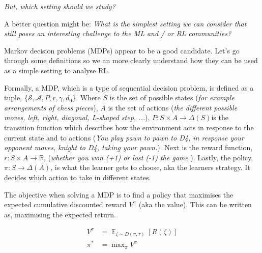 \begin{displayquote}
  \textit{But, which setting should we study?}
\end{displayquote}

\begin{displayquote}
  A better question might be: \textit{What is the simplest setting we can
  consider that still poses an interesting challenge to the ML and / or RL communities?}\footnotemark[26]
\end{displayquote}


Markov decision problems (MDPs) appear to be a good candidate. Let's go through some definitions so we an more clearly understand how they can be used as a
simple setting to analyse RL.

Formally, a MDP, which is a type of sequential decision problem, is defined
as a tuple, $\{\mathcal S, \mathcal A, P,r, \gamma, d_0\}$.
Where $S$ is the set of possible states (\textit{for example arrangements of chess pieces}),
$A$ is the set of actions (\textit{the different possible moves, left,
right, diagonal, L-shaped step, ...}),  $P: S \times A \to \Delta(S)$\footnotemark[16]
is the transition function which describes how the environment acts in response
to the current state and to actions (\textit{You play pawn to pawn to D4, in response your
opponent moves, knight to D4, taking your pawn.}). Next is the reward function, $r: S\times A \to \mathbb R$,
(\textit{whether you won (+1) or lost (-1) the game }).
Lastly, the policy, $\pi: S \to \Delta(A)$, is what the learner gets to choose, aka the learners strategy.
It decides which action to take in different states.


\vspace{5mm}

The objective when solving a MDP is to find a policy
that maximises the expected cumulative discounted reward $V^{\pi}$ (aka the value). This
can be written as, maximising the expected return.

\begin{align*}
V^{\pi} &= \mathop{\mathbb E}_{\zeta \sim D(\pi, \tau)} [R(\zeta)] \\
\pi^{* } &= \mathop{\text{max}}_{\pi}V^{\pi}
\end{align*}


